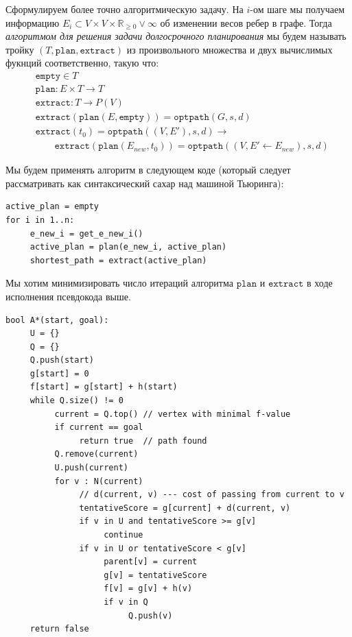 \documentclass[11pt]{article}
\newcommand{\realpositive}{\mathbb{R}_{\geqslant 0}}
\begin{document}
    \pagebreak
    \newcommand{\fplan}{\mathtt{plan}}
    \newcommand{\fextract}{\mathtt{extract}}
    \newcommand{\fempty}{\mathtt{empty}}
    Сформулируем более точно алгоритмическую задачу.
    На $i$-ом шаге мы получаем информацию $E_i \subset V \times V \times \realpositive \lor \infty$ об изменении весов ребер в графе.
    Тогда \textit{алгоритмом для решения задачи долгосрочного планирования} мы будем называть тройку $(T, \fplan, \fextract)$ из произвольного множества и двух вычислимых фукнций соответственно, такую что:
    \begin{align*}
        &\fempty \in T \\
        &\fplan: E \times T \rightarrow T \\
        &\fextract: T \rightarrow P(V) \\
        &\fextract(\fplan(E, \fempty)) = \mathtt{optpath}(G, s, d) \\
        &\fextract(t_0) = \mathtt{optpath}((V, E'), s, d) \rightarrow \\
        &\qquad \fextract(\fplan(E_{new}, t_0)) = \mathtt{optpath}((V, E' \leftarrow E_{new}), s, d)
    \end{align*}

    Мы будем применять алгоритм в следующем коде (который следует рассматривать как синтаксический сахар над машиной Тьюринга):
    \begin{verbatim}
active_plan = empty
for i in 1..n:
     e_new_i = get_e_new_i()
     active_plan = plan(e_new_i, active_plan)
     shortest_path = extract(active_plan)
    \end{verbatim}
    Мы хотим минимизировать число итераций алгоритма $\fplan$ и $\fextract$ в ходе исполнения псевдокода выше.



    \begin{verbatim}
bool A*(start, goal):
     U = {}
     Q = {}
     Q.push(start)
     g[start] = 0
     f[start] = g[start] + h(start)
     while Q.size() != 0
          current = Q.top() // vertex with minimal f-value
          if current == goal
               return true  // path found
          Q.remove(current)
          U.push(current)
          for v : N(current)
               // d(current, v) --- cost of passing from current to v
               tentativeScore = g[current] + d(current, v)
               if v in U and tentativeScore >= g[v]
                    continue
               if v in U or tentativeScore < g[v]
                    parent[v] = current
                    g[v] = tentativeScore
                    f[v] = g[v] + h(v)
                    if v in Q
                         Q.push(v)
     return false
    \end{verbatim}
\end{document}
